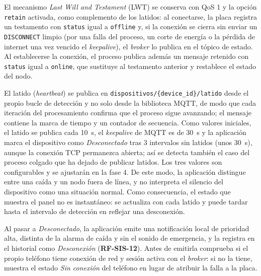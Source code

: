 \documentclass[12pt,a4paper,oneside]{book}
\theoremstyle{plain}
\theoremstyle{definition}
\theoremstyle{remark}
\begin{document}
El mecanismo \textit{Last Will and Testament} (LWT) se conserva con QoS 1 y la opción \texttt{retain} activada, como complemento de los latidos: al conectarse, la placa registra un testamento con \texttt{status} igual a \texttt{offline} y, si la conexión se cierra sin enviar un \texttt{DISCONNECT} limpio (por una falla del proceso, un corte de energía o la pérdida de internet una vez vencido el \textit{keepalive}), el \textit{broker} lo publica en el tópico de estado. Al establecerse la conexión, el proceso publica además un mensaje retenido con \texttt{status} igual a \texttt{online}, que sustituye al testamento anterior y restablece el estado del nodo.

El latido (\textit{heartbeat}) se publica en \texttt{dispositivos/\{device\_id\}/latido} desde el propio bucle de detección y no solo desde la biblioteca MQTT, de modo que cada iteración del procesamiento confirma que el proceso sigue avanzando; el mensaje contiene la marca de tiempo y un contador de secuencia. Como valores iniciales, el latido se publica cada 10~s, el \textit{keepalive} de MQTT es de 30~s y la aplicación marca el dispositivo como \textit{Desconectado} tras 3 intervalos sin latidos (unos 30~s), aunque la conexión TCP permanezca abierta; así se detecta también el caso del proceso colgado que ha dejado de publicar latidos. Los tres valores son configurables y se ajustarán en la fase 4. De este modo, la aplicación distingue entre una caída y un nodo fuera de línea, y no interpreta el silencio del dispositivo como una situación normal. Como consecuencia, el estado que muestra el panel no es instantáneo: se actualiza con cada latido y puede tardar hasta el intervalo de detección en reflejar una desconexión.

Al pasar a \textit{Desconectado}, la aplicación emite una notificación local de prioridad alta, distinta de la alarma de caída y sin el sonido de emergencia, y la registra en el historial como \textit{Desconexión} (\textbf{RF-SIS-12}). Antes de emitirla comprueba si el propio teléfono tiene conexión de red y sesión activa con el \textit{broker}: si no la tiene, muestra el estado \textit{Sin conexión} del teléfono en lugar de atribuir la falla a la placa.
\end{document}
